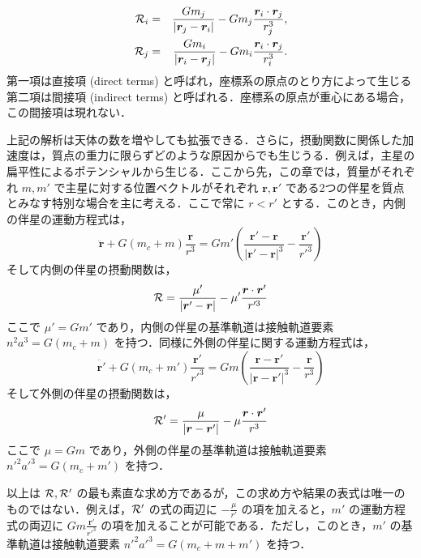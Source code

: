 \documentclass[11pt,a4paper,oneside,onecolumn]{jreport}
\begin{document}
\begin{eqnarray}
{\cal R}_i & = & \frac{G m_j}{ |{\bm r}_j - {\bm r}_i| } - G m_j \frac{ {\bm r}_i \cdot {\bm r}_j }{r_j^3}, \\
{\cal R}_j & = & \frac{G m_i}{ |{\bm r}_i - {\bm r}_j| } - G m_i \frac{ {\bm r}_i \cdot {\bm r}_j }{r_i^3}.
\end{eqnarray}
第一項は直接項 (direct terms) と呼ばれ，座標系の原点のとり方によって生じる第二項は間接項 (indirect terms) と呼ばれる．座標系の原点が重心にある場合，この間接項は現れない．

上記の解析は天体の数を増やしても拡張できる．さらに，摂動関数に関係した加速度は，質点の重力に限らずどのような原因からでも生じうる．例えば，主星の扁平性によるポテンシャルから生じる．ここから先，この章では，質量がそれぞれ $m, m'$ で主星に対する位置ベクトルがそれぞれ ${\bm r}, {\bm r'}$ である2つの伴星を質点とみなす特別な場合を主に考える．ここで常に $r < r'$ とする．このとき，内側の伴星の運動方程式は，
\begin{equation}
\ddot{\bm r} + G (m_c + m) \frac{{\bm r}}{r^3} = G m' \left( \frac{{\bm r'} - {\bm r}}{| {\bm r'} - {\bm r} |^3} - \frac{{\bm r'}}{r'^3} \right)
\end{equation}
そして内側の伴星の摂動関数は，
\begin{equation}
{\cal R} = \frac{\mu'}{ |{\bm r'} - {\bm r}| } - \mu' \frac{ {\bm r} \cdot {\bm r'} }{r'^3} \label{eq:cal_R1}
\end{equation}
ここで $\mu' = G m'$ であり，内側の伴星の基準軌道は接触軌道要素 $n^2 a^3 = G (m_c + m)$ を持つ．同様に外側の伴星に関する運動方程式は，
\begin{equation}
\ddot{\bm r'} + G (m_c + m') \frac{{\bm r'}}{r'^3} = G m \left( \frac{{\bm r} - {\bm r'}}{| {\bm r} - {\bm r'} |^3} - \frac{{\bm r}}{r^3} \right)
\end{equation}
そして外側の伴星の摂動関数は，
\begin{equation}
{\cal R'} = \frac{\mu}{ |{\bm r} - {\bm r'}| } - \mu \frac{ {\bm r} \cdot {\bm r'} }{r^3} \label{eq:cal_R'1}
\end{equation}
ここで $\mu = G m$ であり，外側の伴星の基準軌道は接触軌道要素 $n'^2 a'^3 = G (m_c + m')$ を持つ．

以上は ${\cal R}, {\cal R'}$ の最も素直な求め方であるが，この求め方や結果の表式は唯一のものではない．例えば，${\cal R'}$ の式の両辺に $- \frac{\mu}{r'}$ の項を加えると，$m'$ の運動方程式の両辺に $G m \frac{{\bm r'}}{r'^3}$ の項を加えることが可能である．ただし，このとき，$m'$ の基準軌道は接触軌道要素 $n'^2 a'^3 = G (m_c + m + m')$ を持つ．
\end{document}
